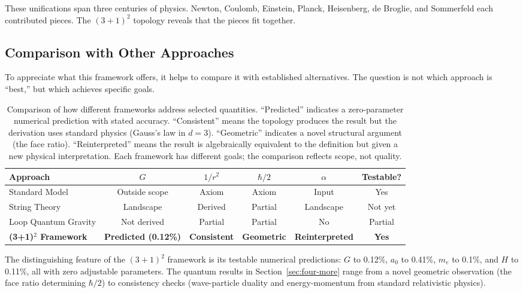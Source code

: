 \documentclass[aps,prd,preprint,superscriptaddress,showpacs,preprintnumbers,amsmath,amssymb,nofootinbib]{revtex4-2}
\begin{document}
These unifications span three centuries of physics. Newton, Coulomb, Einstein, Planck, Heisenberg, de Broglie, and Sommerfeld each contributed pieces. The $(3+1)^2$ topology reveals that the pieces fit together.

\subsection{Comparison with Other Approaches}
\label{subsec:comparison}

To appreciate what this framework offers, it helps to compare it with established alternatives. The question is not which approach is ``best,'' but which achieves specific goals.

\begin{table}[H]
\centering
\small
\begin{tabular*}{\textwidth}{@{\extracolsep{\fill}} lccccc @{}}
\toprule
\textbf{Approach} & \textbf{$G$} & \textbf{$1/r^2$} & \textbf{$\hbar/2$} & \textbf{$\alpha$} & \textbf{Testable?} \\
\midrule
Standard Model & Outside scope & Axiom & Axiom & Input & Yes \\
String Theory & Landscape & Derived & Partial & Landscape & Not yet \\
Loop Quantum Gravity & Not derived & Partial & Partial & No & Partial \\
\textbf{(3+1)$^2$ Framework} & \textbf{Predicted (0.12\%)} & \textbf{Consistent} & \textbf{Geometric} & \textbf{Reinterpreted} & \textbf{Yes} \\
\bottomrule
\end{tabular*}
\caption{Comparison of how different frameworks address selected quantities. ``Predicted'' indicates a zero-parameter numerical prediction with stated accuracy. ``Consistent'' means the topology produces the result but the derivation uses standard physics (Gauss's law in $d = 3$). ``Geometric'' indicates a novel structural argument (the face ratio). ``Reinterpreted'' means the result is algebraically equivalent to the definition but given a new physical interpretation. Each framework has different goals; the comparison reflects scope, not quality.}
\label{tab:comparison}
\end{table}

The distinguishing feature of the $(3+1)^2$ framework is its testable numerical predictions: $G$ to 0.12\%, $a_0$ to 0.41\%, $m_e$ to 0.1\%, and $H$ to 0.11\%, all with zero adjustable parameters. The quantum results in Section~\ref{sec:four-more} range from a novel geometric observation (the face ratio determining $\hbar/2$) to consistency checks (wave-particle duality and energy-momentum from standard relativistic physics).
\end{document}
